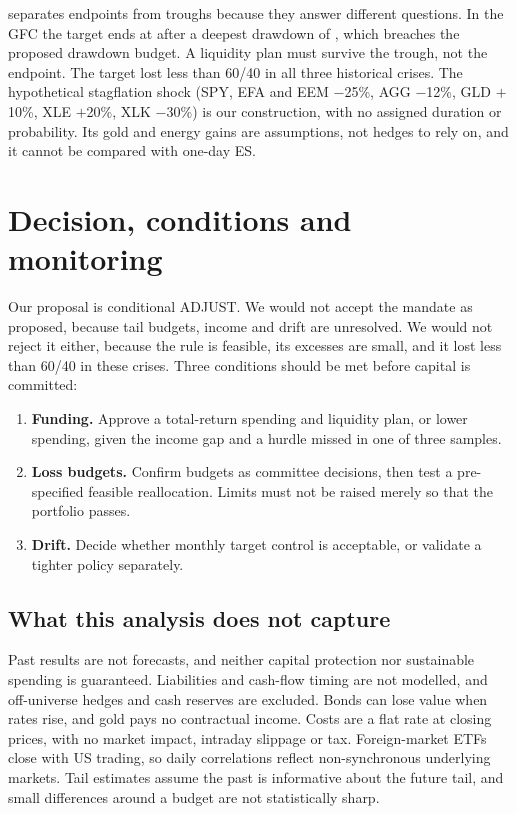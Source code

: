 \documentclass[11pt,a4paper]{article}
\begin{document}
 separates endpoints from troughs because they answer different questions. In the GFC the target ends at \qeGfcReturn{} after a deepest drawdown of \qeGfcDrawdown{}, which breaches the proposed \qeBudgetDrawdown{} drawdown budget. A liquidity plan must survive the trough, not the endpoint. The target lost less than 60/40 in all three historical crises. The hypothetical stagflation shock (SPY, EFA and EEM $-$25\%, AGG $-$12\%, GLD $+$10\%, XLE $+$20\%, XLK $-$30\%) is our construction, with no assigned duration or probability. Its gold and energy gains are assumptions, not hedges to rely on, and it cannot be compared with one-day ES.

\FloatBarrier
\section{Decision, conditions and monitoring}
Our proposal is conditional ADJUST. We would not accept the mandate as proposed, because tail budgets, income and drift are unresolved. We would not reject it either, because the rule is feasible, its excesses are small, and it lost less than 60/40 in these crises. Three conditions should be met before capital is committed:

\begin{enumerate}
\item \textbf{Funding.} Approve a total-return spending and liquidity plan, or lower spending, given the income gap and a hurdle missed in one of three samples.
\item \textbf{Loss budgets.} Confirm budgets as committee decisions, then test a pre-specified feasible reallocation. Limits must not be raised merely so that the portfolio passes.
\item \textbf{Drift.} Decide whether monthly target control is acceptable, or validate a tighter policy separately.
\end{enumerate}

\begin{table}[htb]\centering\caption{Proposed monitoring triggers. Thresholds are team proposals for committee approval.}\label{tab:monitoring}\small\end{table}

\subsection{What this analysis does not capture}
Past results are not forecasts, and neither capital protection nor sustainable spending is guaranteed. Liabilities and cash-flow timing are not modelled, and off-universe hedges and cash reserves are excluded. Bonds can lose value when rates rise, and gold pays no contractual income. Costs are a flat rate at closing prices, with no market impact, intraday slippage or tax. Foreign-market ETFs close with US trading, so daily correlations reflect non-synchronous underlying markets. Tail estimates assume the past is informative about the future tail, and small differences around a budget are not statistically sharp.
\end{document}
